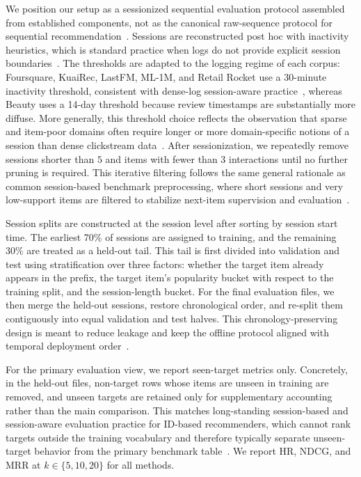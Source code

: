 \documentclass[sigconf,review,anonymous]{acmart}
\begin{document}
We position our setup as a sessionized sequential evaluation protocol assembled from established components, not as the canonical raw-sequence protocol for sequential recommendation~\cite{jannach2022sessions,quadrana2017hrnn,latifi2021sessionaware}. Sessions are reconstructed post hoc with inactivity heuristics, which is standard practice when logs do not provide explicit session boundaries~\cite{jannach2022sessions}. The thresholds are adapted to the logging regime of each corpus: Foursquare, KuaiRec, LastFM, ML-1M, and Retail Rocket use a 30-minute inactivity threshold, consistent with dense-log session-aware practice~\cite{quadrana2017hrnn,lacic2020jobsessions}, whereas Beauty uses a 14-day threshold because review timestamps are substantially more diffuse. More generally, this threshold choice reflects the observation that sparse and item-poor domains often require longer or more domain-specific notions of a session than dense clickstream data~\cite{borgbruun2022insurance}. After sessionization, we repeatedly remove sessions shorter than $5$ and items with fewer than $3$ interactions until no further pruning is required. This iterative filtering follows the same general rationale as common session-based benchmark preprocessing, where short sessions and very low-support items are filtered to stabilize next-item supervision and evaluation~\cite{li2017narm,wu2019srgnn}.

Session splits are constructed at the session level after sorting by session start time. The earliest 70\% of sessions are assigned to training, and the remaining 30\% are treated as a held-out tail. This tail is first divided into validation and test using stratification over three factors: whether the target item already appears in the prefix, the target item's popularity bucket with respect to the training split, and the session-length bucket. For the final evaluation files, we then merge the held-out sessions, restore chronological order, and re-split them contiguously into equal validation and test halves. This chronology-preserving design is meant to reduce leakage and keep the offline protocol aligned with temporal deployment order~\cite{ji2023leakage,gusak2025timesplit}.

For the primary evaluation view, we report seen-target metrics only. Concretely, in the held-out files, non-target rows whose items are unseen in training are removed, and unseen targets are retained only for supplementary accounting rather than the main comparison. This matches long-standing session-based and session-aware evaluation practice for ID-based recommenders, which cannot rank targets outside the training vocabulary and therefore typically separate unseen-target behavior from the primary benchmark table~\cite{latifi2021sessionaware,li2017narm,wu2019srgnn}. We report HR, NDCG, and MRR at $k\in\{5,10,20\}$ for all methods.
\end{document}

